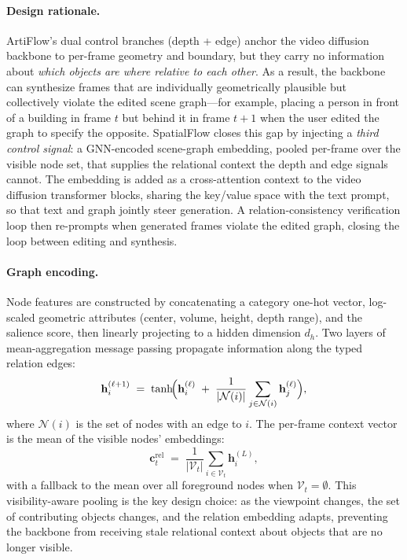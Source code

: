 \paragraph{Design rationale.}
ArtiFlow's dual control branches (depth + edge) anchor the video
diffusion backbone to per-frame geometry and boundary, but they carry
no information about \emph{which objects are where relative to each
other}. As a result, the backbone can synthesize frames that are
individually geometrically plausible but collectively violate the
edited scene graph---for example, placing a person in front of a
building in frame $t$ but behind it in frame $t+1$ when the user
edited the graph to specify the opposite. SpatialFlow closes this gap
by injecting a \emph{third control signal}: a GNN-encoded scene-graph
embedding, pooled per-frame over the visible node set, that supplies
the relational context the depth and edge signals cannot. The
embedding is added as a cross-attention context to the video diffusion
transformer blocks, sharing the key/value space with the text prompt,
so that text and graph jointly steer generation. A
relation-consistency verification loop then re-prompts when generated
frames violate the edited graph, closing the loop between editing and
synthesis.

\paragraph{Graph encoding.}
Node features are constructed by concatenating a category one-hot
vector, log-scaled geometric attributes (center, volume, height, depth
range), and the salience score, then linearly projecting to a hidden
dimension $d_h$. Two layers of mean-aggregation message passing
propagate information along the typed relation edges:
\begin{equation}
    \mathbf{h}_i^{(\ell+1)} \;=\;
        \tanh\!\Bigl(\mathbf{h}_i^{(\ell)} \;+\;
        \frac{1}{|\mathcal{N}(i)|}\sum_{j \in \mathcal{N}(i)}
        \mathbf{h}_j^{(\ell)}\Bigr),
    \label{eq:gnn_mp}
\end{equation}
where $\mathcal{N}(i)$ is the set of nodes with an edge to $i$. The
per-frame context vector is the mean of the visible nodes' embeddings:
\begin{equation}
    \mathbf{c}_t^\text{rel} \;=\;
        \frac{1}{|\mathcal{V}_t|}\sum_{i \in \mathcal{V}_t}
        \mathbf{h}_i^{(L)},
    \label{eq:rel_ctx}
\end{equation}
with a fallback to the mean over all foreground nodes when
$\mathcal{V}_t = \emptyset$. This visibility-aware pooling is the key
design choice: as the viewpoint changes, the set of contributing
objects changes, and the relation embedding adapts, preventing the
backbone from receiving stale relational context about objects that
are no longer visible.

